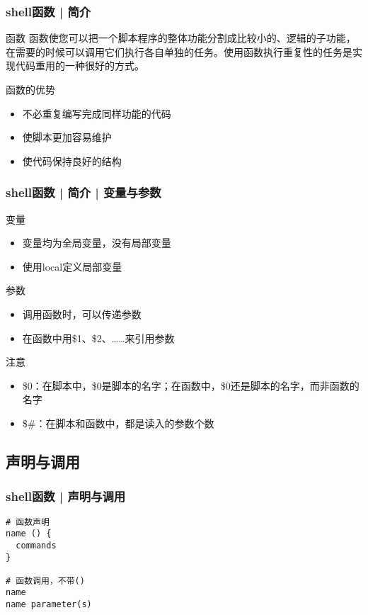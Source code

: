 \begin{frame}
  \frametitle{shell函数 | 简介}
  \begin{block}{函数}
    函数使您可以把一个脚本程序的整体功能分割成比较小的、逻辑的子功能，在需要的时候可以调用它们执行各自单独的任务。使用函数执行重复性的任务是实现代码重用的一种很好的方式。
  \end{block}
  \pause
  \begin{block}{函数的优势}
    \begin{itemize}
      \item 不必重复编写完成同样功能的代码
      \item 使脚本更加容易维护
      \item 使代码保持良好的结构
    \end{itemize}
  \end{block}
\end{frame}

\begin{frame}
  \frametitle{shell函数 | 简介 | \alert{变量与参数}}
  \begin{block}{变量}
    \begin{itemize}
      \item 变量均为全局变量，没有局部变量
      \item 使用local定义局部变量
    \end{itemize}
  \end{block}
  \pause
  \begin{block}{参数}
    \begin{itemize}
      \item 调用函数时，可以传递参数
      \item 在函数中用\$1、\$2、……来引用参数
    \end{itemize}
  \end{block}
  \pause
  \begin{block}{注意}
    \begin{itemize}
      \item \$0：在脚本中，\$0是脚本的名字；在函数中，\$0还是脚本的名字，而非函数的名字
      \item \$\#：在脚本和函数中，都是读入的参数个数
    \end{itemize}
  \end{block}
\end{frame}

\subsection{声明与调用}
\begin{frame}[fragile]
  \frametitle{shell函数 | \alert{声明与调用}}
\begin{lstlisting}
# 函数声明
name () {
  commands
}

# 函数调用，不带()
name
name parameter(s)
\end{lstlisting}
\end{frame}

